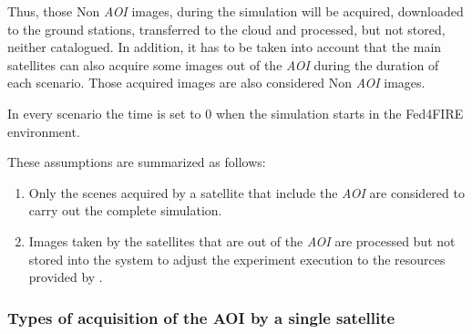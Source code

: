 Thus, those Non \emph{AOI} images, during the simulation will be acquired,
downloaded to the ground stations, transferred to the cloud and processed, but
not stored, neither catalogued. In addition, it has to be taken into account
that the main satellites can also acquire some images out of the \emph{AOI}
during the duration of each scenario. Those acquired images are also considered
Non \emph{AOI} images.

In every scenario the time is set to 0 when the simulation starts in the Fed4FIRE environment.

These assumptions are summarized as follows:
\begin{enumerate}
\item Only the scenes acquired by a satellite that include the \emph{AOI} are considered to carry out the complete simulation.
\item Images taken by the satellites that are out of the \emph{AOI} are processed but
  not stored into the system to adjust the experiment execution to the resources
  provided by \bonfire.
\end{enumerate}

\subsubsection{Types of acquisition of the AOI by a single satellite}
\label{subsubsec:types-acquisition}

